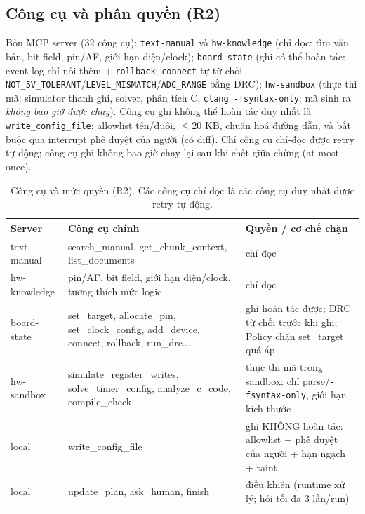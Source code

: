 \documentclass[11pt,a4paper,twocolumn]{article}
\begin{document}
\subsection{Công cụ và phân quyền (R2)}
Bốn MCP server (32 công cụ): \texttt{text-manual} và \texttt{hw-knowledge} (chỉ đọc: tìm văn bản, bit field, pin/AF, giới hạn điện/clock); \texttt{board-state} (ghi có thể hoàn tác: event log chỉ nối thêm + \texttt{rollback}; \texttt{connect} tự từ chối \texttt{NOT\_5V\_TOLERANT}/\texttt{LEVEL\_MISMATCH}/\texttt{ADC\_RANGE} bằng DRC); \texttt{hw-sandbox} (thực thi mã: simulator thanh ghi, solver, phân tích C, \texttt{clang -fsyntax-only}; mã sinh ra \emph{không bao giờ được chạy}). Công cụ ghi không thể hoàn tác duy nhất là \texttt{write\_config\_file}: allowlist tên/đuôi, $\le$20 KB, chuẩn hoá đường dẫn, và bắt buộc qua interrupt phê duyệt của người (có diff). Chỉ công cụ chỉ-đọc được retry tự động; công cụ ghi không bao giờ chạy lại sau khi chết giữa chừng (at-most-once).

\begin{table}[h]\centering\footnotesize
\begin{tabularx}{\columnwidth}{@{}l>{\raggedright\arraybackslash}X>{\raggedright\arraybackslash}p{3.0cm}@{}}
\toprule
Server & Công cụ chính & Quyền / cơ chế chặn\\\midrule
text-manual & search\_manual, get\_chunk\_context, list\_documents & chỉ đọc\\
hw-knowledge & pin/AF, bit field, giới hạn điện/clock, tương thích mức logic & chỉ đọc\\
board-state & set\_target, allocate\_pin, set\_clock\_config, add\_device, connect, rollback, run\_drc... & ghi hoàn tác được; DRC từ chối trước khi ghi; Policy chặn set\_target quá áp\\
hw-sandbox & simulate\_register\_writes, solve\_timer\_config, analyze\_c\_code, compile\_check & thực thi mã trong sandbox: chỉ parse/\texttt{-fsyntax-only}, giới hạn kích thước\\
local & write\_config\_file & ghi KHÔNG hoàn tác: allowlist + phê duyệt của người + hạn ngạch + taint\\
local & update\_plan, ask\_human, finish & điều khiển (runtime xử lý; hỏi tối đa 3 lần/run)\\
\bottomrule
\end{tabularx}
\caption{Công cụ và mức quyền (R2). Các công cụ chỉ đọc là các công cụ duy nhất được retry tự động.}\label{tab:tools}
\end{table}
\end{document}
